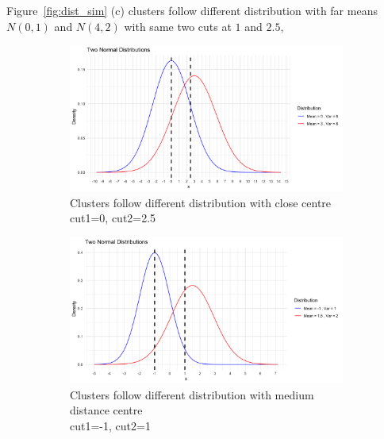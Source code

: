 \documentclass{article}
\begin{document}
Figure~\ref*{fig:dist_sim} (c) clusters follow different distribution with far means $N(0,1)$ and $N(4,2)$
with same two cuts at $1$ and $2.5$,

\begin{figure}[htbp!]
  \centering
  \begin{subfigure}{0.32\textwidth}  %
    \centering
    \includegraphics[width=\textwidth]{images/dist_simu/nor_close.png} %
    \caption{Clusters follow different distribution with close centre\\ cut1=0, cut2=2.5}
\end{subfigure}
  \hfill
  \begin{subfigure}{0.32\textwidth}  %
    \centering
    \includegraphics[width=\textwidth]{images/dist_simu/nor.png} %
    \caption{Clusters follow different distribution with medium distance centre\\ cut1=-1, cut2=1}
\end{subfigure}
  \hfill
  \begin{subfigure}{0.32\textwidth}  %

\end{subfigure}
\end{figure}
\end{document}
